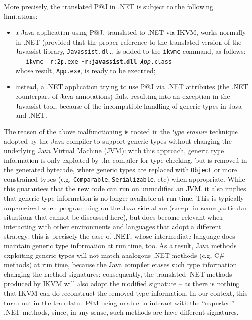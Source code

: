 More precisely, the translated P@J in .NET is subject to the following limitations:

\begin{itemize}
  \item a Java application using P@J, translated to .NET via IKVM, works normally in .NET (provided that the proper reference to the translated version of the Javassist library, \texttt{Javassist.dll}, is added to the \texttt{ikvmc} command, as follows:\\
      \texttt{\mbox{~~~}ikvmc -r:2p.exe \textbf{-r:javassist.dll} \textit{App}.class }\\
      whose result, \texttt{App.exe}, is ready to be executed;

  \item instead, a .NET application trying to use P@J via .NET attributes (the .NET counterpart of Java annotations) fails, resulting into an exception in the Javassist tool, because of the incompatible handling of generic types in Java and .NET.
\end{itemize}

\noindent The reason of the above malfunctioning is rooted in the \textit{type erasure} technique adopted by the Java compiler to support generic types without changing the underlying Java Virtual Machine (JVM): with this approach, generic type information is only exploited by the compiler for type checking, but is removed in the generated bytecode, where generic types are replaced with \texttt{Object} or more constrained types (e.g. \texttt{Comparable}, \texttt{Serializable}, etc) when appropriate. While this guarantees that the new code can run on unmodified an JVM, it also implies that generic type information is no longer available at run time.
This is typically unperceived when programming on the Java side alone (except in some particular situations that cannot be discussed here), but does become relevant when interacting with other environments and languages that adopt a different strategy: this is precisely the case of .NET, whose intermediate language does maintain generic type information at run time, too.
As a result, Java methods exploiting generic types will not match analogous .NET methods (e.g, C\# methods) at run time, because the Java compiler erases such type information changing the method signatures: consequently, the translated .NET methods produced by IKVM will also adopt the modified signature -- as there is nothing that IKVM can do reconstruct the removed type information.
In our context, this turns out in the translated P@J being unable to interact with the ``expected'' .NET methods, since, in any sense, such methods are have different signatures.


